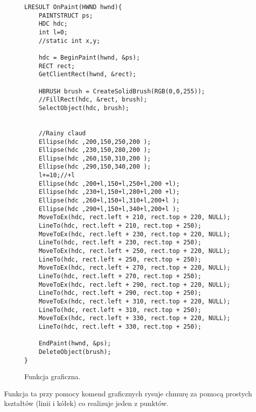 \documentclass[a4paper,twoside,12pt]{mgr}
\begin{document}
\begin{figure}[H]
\centering
\begin{lstlisting}[frame=single]	
LRESULT OnPaint(HWND hwnd){
	PAINTSTRUCT ps;
	HDC hdc;
	int l=0;
	//static int x,y;

	hdc = BeginPaint(hwnd, &ps);
	RECT rect;
	GetClientRect(hwnd, &rect);
	
	HBRUSH brush = CreateSolidBrush(RGB(0,0,255));
	//FillRect(hdc, &rect, brush);
	SelectObject(hdc, brush);
	
	
	//Rainy claud
	Ellipse(hdc ,200,150,250,200 );
	Ellipse(hdc ,230,150,280,200 );
	Ellipse(hdc ,260,150,310,200 );
	Ellipse(hdc ,290,150,340,200 );
	l+=10;//+l
	Ellipse(hdc ,200+l,150+l,250+l,200 +l);
	Ellipse(hdc ,230+l,150+l,280+l,200 +l);
	Ellipse(hdc ,260+l,150+l,310+l,200+l );
	Ellipse(hdc ,290+l,150+l,340+l,200+l );
	MoveToEx(hdc, rect.left + 210, rect.top + 220, NULL);
	LineTo(hdc, rect.left + 210, rect.top + 250);
	MoveToEx(hdc, rect.left + 230, rect.top + 220, NULL);
	LineTo(hdc, rect.left + 230, rect.top + 250);
	MoveToEx(hdc, rect.left + 250, rect.top + 220, NULL);
	LineTo(hdc, rect.left + 250, rect.top + 250);
	MoveToEx(hdc, rect.left + 270, rect.top + 220, NULL);
	LineTo(hdc, rect.left + 270, rect.top + 250);
	MoveToEx(hdc, rect.left + 290, rect.top + 220, NULL);
	LineTo(hdc, rect.left + 290, rect.top + 250);
	MoveToEx(hdc, rect.left + 310, rect.top + 220, NULL);
	LineTo(hdc, rect.left + 310, rect.top + 250);
	MoveToEx(hdc, rect.left + 330, rect.top + 220, NULL);
	LineTo(hdc, rect.left + 330, rect.top + 250);
	
	EndPaint(hwnd, &ps);
	DeleteObject(brush);
}
\end{lstlisting}
\caption{Funkcja graficzna.}%
\label{rys:etykieta}
\end{figure}

Funkcja ta przy pomocy komend graficznych rysuje chmurę za pomocą prostych kształtów (linii i kółek) co realizuje jeden z punktów.
\end{document}
